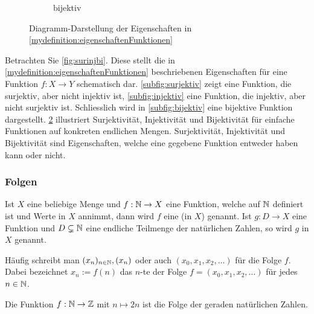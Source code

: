 \begin{figure}[H]
\begin{subfigure}[b]{0.30\textwidth}
		\caption{bijektiv}
		\label{subfig:bijektivDiagramm}
	\end{subfigure}
	\caption{Diagramm-Darstellung der Eigenschaften in \cref{mydefinition:eigenschaftenFunktionen}}
	\label{fig:diagsurinjbi}
\end{figure}

\noindent
Betrachten Sie \cref{fig:surinjbi}. Diese stellt die in \cref{mydefinition:eigenschaftenFunktionen} beschriebenen Eigenschaften für eine Funktion $f:X\to Y$ schematisch dar.
\cref{subfig:surjektiv} zeigt eine Funktion, die surjektiv, aber nicht injektiv ist, \cref{subfig:injektiv} eine Funktion, die injektiv, aber nicht surjektiv ist.
Schliesslich wird in \cref{subfig:bijektiv} eine bijektive Funktion dargestellt. \cref{fig:diagsurinjbi} illustriert Surjektivität, Injektivität und Bijektivität für einfache Funktionen auf konkreten endlichen Mengen.
Surjektivität, Injektivität und Bijektivität sind Eigenschaften, welche eine gegebene Funktion entweder haben kann oder nicht.

\subsubsection{Folgen}
\begin{mydefinition}[Folge]\label{mydefinition:Folge}
Ist $X$ eine beliebige Menge und $f:\mathbb{N}\to X$ eine Funktion, welche auf $\mathbb{N}$ definiert ist und Werte in $X$ annimmt, dann wird $f$ eine  (in $X$) genannt.
Ist $g:D\to X$ eine Funktion und $D\subsetneq\mathbb{N}$ eine endliche Teilmenge der natürlichen Zahlen, so wird $g$  in $X$ genannt.
\end{mydefinition}
Häufig schreibt man $(x_n)_{n\in\mathbb{N}}, (x_n)$ oder auch $(x_0,x_1,x_2,\dots)$ für die Folge $f$. Dabei bezeichnet $x_n := f(n)$ das $n$-te  der Folge $f = (x_0,x_1,x_2,\dots)$ für jedes $n\in\mathbb{N}$.
\begin{myexample}
Die Funktion $f:\mathbb{N}\to\mathbb{Z}$ mit $n\mapsto 2n$ ist die Folge der geraden natürlichen Zahlen.
\end{myexample}

